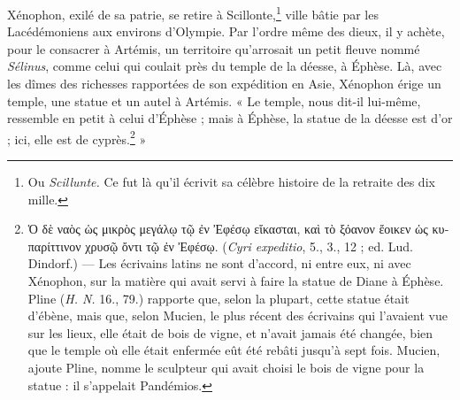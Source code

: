 \documentclass{article}
\begin{document}
Xénophon, exilé de sa patrie, se retire à Scillonte,\footnote{Ou \emph{Scillunte.} Ce fut là qu'il écrivit sa célèbre histoire de la retraite des dix mille.} ville bâtie par les Lacédémoniens aux environs d'Olympie. Par l'ordre même des dieux, il y achète, pour le consacrer à Artémis, un territoire qu'arrosait un petit fleuve nommé \emph{Sélinus}, comme celui qui coulait près du temple de la déesse, à Éphèse. Là, avec les dîmes des richesses rapportées de son expédition en Asie, Xénophon érige un temple, une statue et un autel à Artémis. « Le temple, nous dit-il lui-même, ressemble en petit à celui d'Éphèse ; mais à Éphèse, la statue de la déesse est d'or ; ici, elle est de cyprès.\footnote{\textgreek{Ὁ δὲ ναὸς ὡς μικρὸς μεγάλῳ τῷ ἐν Ἐφέσῳ εἴκασται, καὶ τὸ ξόανον ἔοικεν ὡς κυπαρίττινον χρυσῷ ὄντι τῷ ἐν Ἐφέσῳ.} (\emph{Cyri expeditio}, 5., 3., 12 ; ed. Lud. Dindorf.) --- Les écrivains latins ne sont d'accord, ni entre eux, ni avec Xénophon, sur la matière qui avait servi à faire la statue de Diane à Éphèse. Pline (\emph{H. N.} 16., 79.) rapporte que, selon la plupart, cette statue était d'ébène, mais que, selon Mucien, le plus récent des écrivains qui l'avaient vue sur les lieux, elle était de bois de vigne, et n'avait jamais été changée, bien que le temple où elle était enfermée eût été rebâti jusqu'à sept fois. Mucien, ajoute Pline, nomme le sculpteur qui avait choisi le bois de vigne pour la statue : il s'appelait Pandémios.} »
\end{document}
